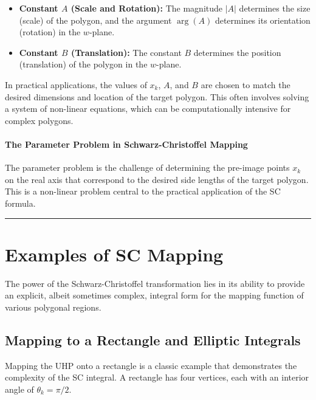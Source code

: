 \documentclass[12pt,a4paper]{article}
\begin{document}
\begin{itemize}
\item \textbf{Constant \(A\) (Scale
and Rotation):} The magnitude \(|A|\) determines the size (scale) of the
polygon, and the argument \(\arg(A)\) determines its orientation
(rotation) in the \(w\)-plane.

\item \textbf{Constant \(B\) (Translation):}
The constant \(B\) determines the position (translation) of the polygon
in the \(w\)-plane.
\end{itemize}

In practical applications, the values of \(x_k\), \(A\), and \(B\) are
chosen to match the desired dimensions and location of the target
polygon. This often involves solving a system of non-linear equations,
which can be computationally intensive for complex polygons.

\paragraph{The Parameter Problem in Schwarz-Christoffel
Mapping}\label{the-parameter-problem-in-schwarz-christoffel-mapping}

The parameter problem is the challenge of determining the pre-image
points \(x_k\) on the real axis that correspond to the desired side
lengths of the target polygon. This is a non-linear problem central to
the practical application of the SC formula.

\begin{center}\rule{0.5\linewidth}{0.5pt}\end{center}

\newpage
\section{Examples of SC
Mapping}\label{examples-of-sc-mapping-1}

The power of the Schwarz-Christoffel transformation lies in its ability
to provide an explicit, albeit sometimes complex, integral form for the
mapping function of various polygonal regions.

\subsection{Mapping to a Rectangle and Elliptic
Integrals}\label{mapping-to-a-rectangle-and-elliptic-integrals}

Mapping the UHP onto a rectangle is a classic example that demonstrates
the complexity of the SC integral. A rectangle has four vertices, each
with an interior angle of \(\theta_k = \pi/2\).
\end{document}

